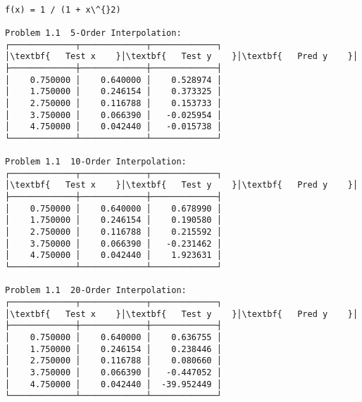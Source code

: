 \documentclass[11pt]{article}
\begin{document}
    \begin{center}
    \end{center}
    { \hspace*{\fill} \\}
    
    \begin{Verbatim}[commandchars=\\\{\}]
f(x) = 1 / (1 + x\^{}2)

Problem 1.1  5-Order Interpolation:
┌─────────────┬─────────────┬─────────────┐
│\textbf{   Test x    }│\textbf{   Test y    }│\textbf{   Pred y    }│
├─────────────┼─────────────┼─────────────┤
│    0.750000 │    0.640000 │    0.528974 │
│    1.750000 │    0.246154 │    0.373325 │
│    2.750000 │    0.116788 │    0.153733 │
│    3.750000 │    0.066390 │   -0.025954 │
│    4.750000 │    0.042440 │   -0.015738 │
└─────────────┴─────────────┴─────────────┘

Problem 1.1  10-Order Interpolation:
┌─────────────┬─────────────┬─────────────┐
│\textbf{   Test x    }│\textbf{   Test y    }│\textbf{   Pred y    }│
├─────────────┼─────────────┼─────────────┤
│    0.750000 │    0.640000 │    0.678990 │
│    1.750000 │    0.246154 │    0.190580 │
│    2.750000 │    0.116788 │    0.215592 │
│    3.750000 │    0.066390 │   -0.231462 │
│    4.750000 │    0.042440 │    1.923631 │
└─────────────┴─────────────┴─────────────┘

Problem 1.1  20-Order Interpolation:
┌─────────────┬─────────────┬─────────────┐
│\textbf{   Test x    }│\textbf{   Test y    }│\textbf{   Pred y    }│
├─────────────┼─────────────┼─────────────┤
│    0.750000 │    0.640000 │    0.636755 │
│    1.750000 │    0.246154 │    0.238446 │
│    2.750000 │    0.116788 │    0.080660 │
│    3.750000 │    0.066390 │   -0.447052 │
│    4.750000 │    0.042440 │  -39.952449 │
└─────────────┴─────────────┴─────────────┘
    \end{Verbatim}
\end{document}
